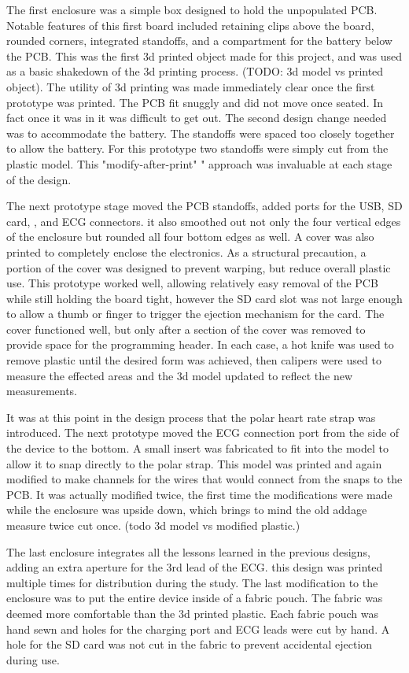 The first enclosure was a simple box designed to hold the unpopulated PCB. Notable features of this first board included retaining clips above the board, rounded corners, integrated standoffs, and a compartment for the battery below the PCB. This was the first 3d printed object made for this project, and was used as a basic shakedown of the 3d printing process. (TODO: 3d model vs printed object). The utility of 3d printing was made immediately clear once the first prototype was printed. The PCB fit snuggly and did not move once seated. In fact once it was in it was difficult to get out. The second design change needed was to accommodate the battery. The standoffs were spaced too closely together to allow the battery. For this prototype two standoffs were simply cut from the plastic model. This "modify-after-print" " approach was invaluable at each stage of the design.

The next prototype stage moved the PCB standoffs, added ports for the USB, SD card, , and ECG connectors. it also smoothed out not only the four vertical edges of the enclosure but rounded all four bottom edges as well. A cover was also printed to completely enclose the electronics. As a structural precaution, a portion of the cover was designed to prevent warping, but reduce overall plastic use. This prototype worked well, allowing relatively easy removal of the PCB while still holding the board tight, however the SD card slot was not large enough to allow a thumb or finger to trigger the ejection mechanism for the card. The cover functioned well, but only after a section of the cover was removed to provide space for the programming header. In each case, a hot knife was used to remove plastic until the desired form was achieved, then calipers were used to measure the effected areas and the 3d model updated to reflect the new measurements.

It was at this point in the design process that the polar heart rate strap was introduced. The next prototype moved the ECG connection port from the side of the device to the bottom. A small insert was fabricated to fit into the model to allow it to snap directly to the polar strap. This model was printed and again modified to make channels for the wires that would connect from the snaps to the PCB. It was actually modified twice, the first time the modifications were made while the enclosure was upside down, which brings to mind the old addage measure twice cut once. (todo 3d model vs modified plastic.)

The last enclosure integrates all the lessons learned in the previous designs, adding an extra aperture for the 3rd lead of the ECG. this design was printed multiple times for distribution during the study. The last modification to the enclosure was to put the entire device inside of a fabric pouch. The fabric was deemed more comfortable than the 3d printed plastic. Each fabric pouch was hand sewn and holes for the charging port and ECG leads were cut by hand. A hole for the SD card was not cut in the fabric to prevent accidental ejection during use.

